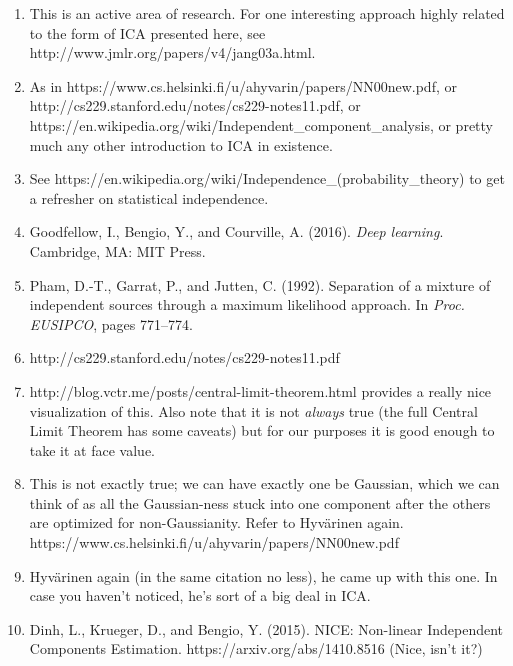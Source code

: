 \documentclass[11pt]{article}
\providecommand{\tightlist}{%
      \setlength{\itemsep}{0pt}\setlength{\parskip}{0pt}}
\begin{document}
\begin{enumerate}
\def\labelenumi{\arabic{enumi}.}
\tightlist
\item
  This is an active area of research. For one interesting approach
  highly related to the form of ICA presented here, see
  http://www.jmlr.org/papers/v4/jang03a.html.
\item
  As in https://www.cs.helsinki.fi/u/ahyvarin/papers/NN00new.pdf, or
  http://cs229.stanford.edu/notes/cs229-notes11.pdf, or
  https://en.wikipedia.org/wiki/Independent\_component\_analysis, or
  pretty much any other introduction to ICA in existence.
\item
  See https://en.wikipedia.org/wiki/Independence\_(probability\_theory)
  to get a refresher on statistical independence.
\item
  Goodfellow, I., Bengio, Y., and Courville, A. (2016). \emph{Deep
  learning}. Cambridge, MA: MIT Press.
\item
  Pham, D.-T., Garrat, P., and Jutten, C. (1992). Separation of a
  mixture of independent sources through a maximum likelihood approach.
  In \emph{Proc. EUSIPCO}, pages 771--774.
\item
  http://cs229.stanford.edu/notes/cs229-notes11.pdf
\item
  http://blog.vctr.me/posts/central-limit-theorem.html provides a really
  nice visualization of this. Also note that it is not \emph{always}
  true (the full Central Limit Theorem has some caveats) but for our
  purposes it is good enough to take it at face value.
\item
  This is not exactly true; we can have exactly one be Gaussian, which
  we can think of as all the Gaussian-ness stuck into one component
  after the others are optimized for non-Gaussianity. Refer to Hyvärinen
  again. https://www.cs.helsinki.fi/u/ahyvarin/papers/NN00new.pdf
\item
  Hyvärinen again (in the same citation no less), he came up with this
  one. In case you haven't noticed, he's sort of a big deal in ICA.
\item
  Dinh, L., Krueger, D., and Bengio, Y. (2015). NICE: Non-linear
  Independent Components Estimation. https://arxiv.org/abs/1410.8516
  (Nice, isn't it?)
\end{enumerate}


    
    
    
    
\end{document}
